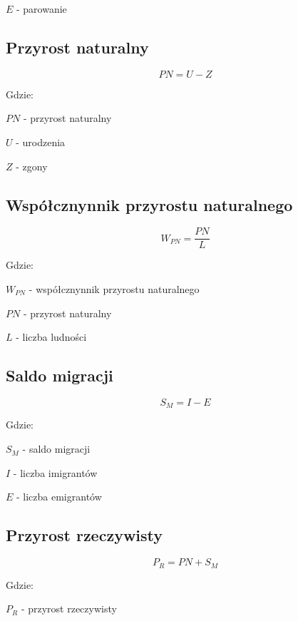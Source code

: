 \documentclass[a4paper,10pt]{article}
\begin{document}
  $ E $ - parowanie
  
  \subsection{Przyrost naturalny}
  
  \begin{equation}
   PN = U - Z
  \end{equation}
  
  Gdzie:
  
  $ PN $ - przyrost naturalny
  
  $ U $ - urodzenia
  
  $ Z $ - zgony

  \subsection{Współcznynnik przyrostu naturalnego}
  
  \begin{equation}
   W_{PN} = \frac{PN}{L}
  \end{equation}
  
  Gdzie:
  
  $ W_{PN} $ - współcznynnik przyrostu naturalnego
  
  $ PN $ - przyrost naturalny
  
  $ L $ - liczba ludności
    
  \subsection{Saldo migracji}
  
  \begin{equation}
   S_{M} = I - E
  \end{equation}

  Gdzie:
  
  $ S_{M} $ - saldo migracji
  
  $ I $ - liczba imigrantów
  
  $ E $ - liczba emigrantów
  
  \subsection{Przyrost rzeczywisty}
  
  \begin{equation}
   P_{R} = PN + S_{M}
  \end{equation}

  Gdzie:
  
  $ P_{R} $ - przyrost rzeczywisty
  
\end{document}
